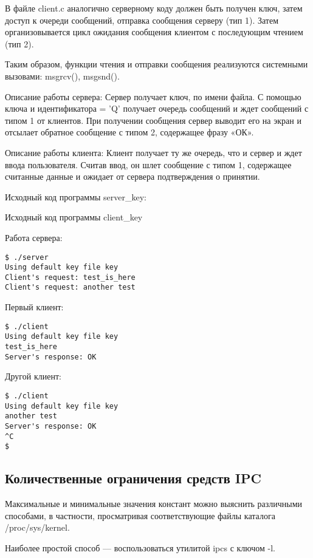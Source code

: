 \documentclass[a4paper]{article}
\begin{document}
	В файле client.c аналогично серверному коду должен быть получен ключ, затем доступ к очереди сообщений, отправка сообщения серверу (тип 1). Затем организовывается цикл ожидания сообщения клиентом с последующим чтением (тип 2).
	
	Таким образом, функции чтения и отправки сообщения реализуются системными вызовами: msgrcv(), msgsnd().
	
	Описание работы сервера: Сервер получает ключ, по имени файла. С помощью ключа и идентификатора = 'Q' получает очередь сообщений и ждет сообщений с типом 1 от клиентов. При получении сообщения сервер выводит его на экран и отсылает обратное сообщение с типом 2, содержащее фразу «ОК».

	Описание работы клиента: Клиент получает ту же очередь, что и сервер и ждет ввода пользователя. Считав ввод, он шлет сообщение с типом 1, содержащее считанные данные и ожидает от сервера подтверждения о принятии.
	
	Исходный код программы server\_key:
	

		
	Исходный код программы client\_key
	
	
	Работа сервера:
	\begin{lstlisting}[style=crs_bash]
$ ./server    
Using default key file key
Client's request: test_is_here
Client's request: another test
	\end{lstlisting}
	
	Первый клиент:
	\begin{lstlisting}[style=crs_bash]
$ ./client 
Using default key file key
test_is_here
Server's response: OK

	\end{lstlisting}
	
	Другой клиент:
	\begin{lstlisting}[style=crs_bash]
$ ./client 
Using default key file key
another test
Server's response: OK
^C
$
	\end{lstlisting}
	
\subsection{Количественные ограничения средств IPC}
	Максимальные и минимальные значения констант можно выяснить различными способами, в частности, просматривая соответствующие файлы каталога /proc/sys/kernel.
	
	Наиболее простой способ --– воспользоваться утилитой ipcs с ключом -l.
	
	
\end{document}
